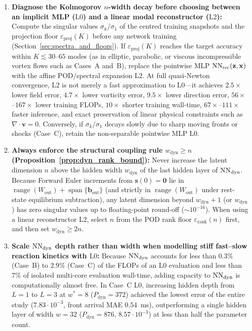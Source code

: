 \begin{enumerate}[leftmargin=2em]
  \item \textbf{Diagnose the Kolmogorov $n$-width decay before choosing between an implicit MLP ($\mathrm{L0}$) and a linear modal reconstructor ($\mathrm{L2}$):} Compute the singular values $\sigma_k/\sigma_1$ of the centred training snapshots and the projection floor $\varepsilon_{\mathrm{proj}}(K)$ before any network training (Section~\ref{sec:spectra_and_floors}). If $\varepsilon_{\mathrm{proj}}(K)$ reaches the target accuracy within $K \lesssim 30$--$65$ modes (as in elliptic, parabolic, or viscous incompressible vortex flows such as Cases~A and~B), replace the pointwise MLP $\mathrm{NN}_{\mathrm{rec}}(\mathbf{z},\mathbf{x})$ with the affine POD/spectral expansion $\mathrm{L2}$. At full quasi-Newton convergence, $\mathrm{L2}$ is not merely a fast approximation to $\mathrm{L0}$---it achieves $2.5\times$ lower field error, $4.7\times$ lower vorticity error, $9.5\times$ lower direction error, $56\times$--$167\times$ lower training FLOPs, $10\times$ shorter training wall-time, $67\times$--$111\times$ faster inference, and exact preservation of linear physical constraints such as $\nabla\cdot\mathbf{v} = 0$. Conversely, if $\sigma_k/\sigma_1$ decays slowly due to sharp moving fronts or shocks (Case~C), retain the non-separable pointwise MLP $\mathrm{L0}$.
  \item \textbf{Always enforce the structural coupling rule $w_{\mathrm{dyn}} \ge n$ (Proposition~\ref{prop:dyn_rank_bound}):} Never increase the latent dimension $n$ above the hidden width $w_{\mathrm{dyn}}$ of the last hidden layer of $\mathrm{NN}_{\mathrm{dyn}}$. Because Forward Euler increments from $\mathbf{s}(0) = \mathbf{0}$ lie in $\operatorname{range}(W_{\mathrm{out}}) + \operatorname{span}\{\mathbf{b}_{\mathrm{out}}\}$ (and strictly in $\operatorname{range}(W_{\mathrm{out}})$ under rest-state equilibrium subtraction), any latent dimension beyond $w_{\mathrm{dyn}} + 1$ (or $w_{\mathrm{dyn}}$) has zero singular values up to floating-point round-off ($\sim 10^{-16}$). When using a linear reconstructor $\mathrm{L2}$, select $n$ from the POD rank floor $\varepsilon_{\mathrm{rank}}(n)$ first, and then set $w_{\mathrm{dyn}} \ge 2n$.
  \item \textbf{Scale $\mathrm{NN}_{\mathrm{dyn}}$ depth rather than width when modelling stiff fast--slow reaction kinetics with $\mathrm{L0}$:} Because $\mathrm{NN}_{\mathrm{dyn}}$ accounts for less than $0.3\%$ (Case~B) to $2.9\%$ (Case~C) of the FLOPs of an $\mathrm{L0}$ evaluation and less than $7\%$ of isolated multi-core evaluation wall-time, adding capacity to $\mathrm{NN}_{\mathrm{dyn}}$ is computationally almost free. In Case~C $\mathrm{L0}$, increasing hidden depth from $L=1$ to $L=3$ at $w^*=8$ ($P_{\mathrm{dyn}} = 372$) achieved the lowest error of the entire study ($7.83\cdot 10^{-3}$, front arrival MAE $0.54$~ms), outperforming a single hidden layer of width $w=32$ ($P_{\mathrm{dyn}} = 876$, $8.57\cdot 10^{-3}$) at less than half the parameter count.

\end{enumerate}
